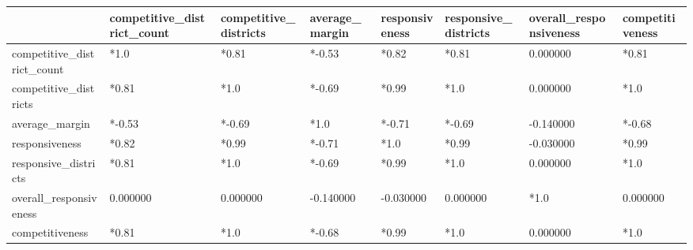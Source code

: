 \begin{tabular}{llllllll}
\toprule
 & competitive_district_count & competitive_districts & average_margin & responsiveness & responsive_districts & overall_responsiveness & competitiveness \\
\midrule
competitive_district_count & *1.0 & *0.81 & *-0.53 & *0.82 & *0.81 & 0.000000 & *0.81 \\
competitive_districts & *0.81 & *1.0 & *-0.69 & *0.99 & *1.0 & 0.000000 & *1.0 \\
average_margin & *-0.53 & *-0.69 & *1.0 & *-0.71 & *-0.69 & -0.140000 & *-0.68 \\
responsiveness & *0.82 & *0.99 & *-0.71 & *1.0 & *0.99 & -0.030000 & *0.99 \\
responsive_districts & *0.81 & *1.0 & *-0.69 & *0.99 & *1.0 & 0.000000 & *1.0 \\
overall_responsiveness & 0.000000 & 0.000000 & -0.140000 & -0.030000 & 0.000000 & *1.0 & 0.000000 \\
competitiveness & *0.81 & *1.0 & *-0.68 & *0.99 & *1.0 & 0.000000 & *1.0 \\
\bottomrule
\end{tabular}

